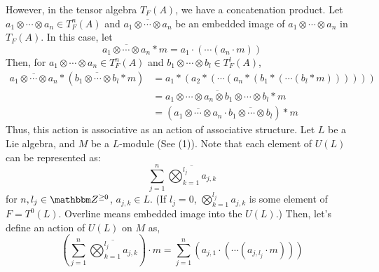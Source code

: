 However, in the tensor algebra \(T_F(A)\),
we have a concatenation product.
Let \(a_1 \otimes \cdots \otimes a_n \in T_F^n(A)\)
and \(\overline{a_1 \otimes \cdots \otimes a_n}\) be an embedded image of \(a_1 \otimes \cdots \otimes a_n\)
in \(T_F(A)\).
In this case, let 
\[\overline{a_1 \otimes \cdots \otimes a_n} * m = a_1 \cdot ( \cdots (a_n \cdot m))\]
Then,
for \(a_1 \otimes \cdots \otimes a_n \in T_F^n(A)\)
and \(b_1 \otimes \cdots \otimes b_l \in T_F^l(A)\),
\begin{align*}
  \overline{a_1 \otimes \cdots \otimes a_n} * (\overline{b_1 \otimes \cdots \otimes b_l} * m)
  &= a_1 * (a_2 * (\cdots (a_n * (b_1 * (\cdots (b_l * m))))))
  \\&=
  \overline{a_1 \otimes \cdots \otimes a_n \otimes b_1 \otimes \cdots \otimes b_l} * m
  \\&=
  \left(\overline{a_1 \otimes \cdots \otimes a_n} \cdot \overline{b_1 \otimes \cdots \otimes b_l} \right) * m
\end{align*}
Thus, this action is associative as an action of associative structure.
\br
\noindent
Let \(L\) be a Lie algebra, and \(M\) be a \(L\)-module (See (1)).
Note that each element of \(U(L)\) can be represented as:
\[\sum_{j=1}^{n} \overline{\bigotimes_{k=1}^{l_j} a_{j,k}}\]
for \(n, l_j \in \bbZ^{\ge 0}\), \(a_{j,k} \in L\).
(If \(l_j = 0\), \(\bigotimes_{k=1}^{l_j} a_{j,k}\) is some element of \(F = T^0(L)\).
Overline means embedded image into the \(U(L)\).)
Then, let's define an action of \(U(L)\) on \(M\) as,
\[\left(\sum_{j=1}^{n} \overline{\bigotimes_{k=1}^{l_j} a_{j,k}}\right) \cdot m
= \sum_{j=1}^{n} (a_{j,1} \cdot (\cdots ( a_{j,l_j} \cdot m)))\]

